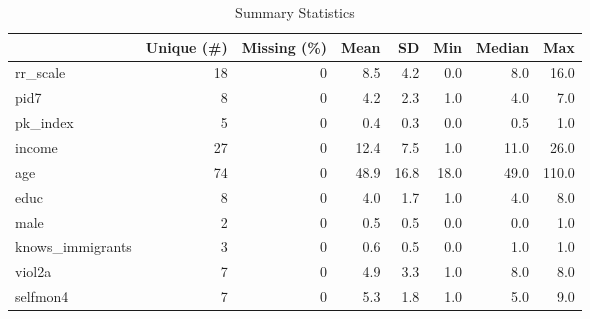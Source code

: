 \begin{table}
\centering
\caption{Summary Statistics}
\centering
\begin{tabular}[t]{lrrrrrrr}
\toprule
  & Unique (\#) & Missing (\%) & Mean & SD & Min & Median & Max\\
\midrule
rr\_scale & 18 & 0 & \num{8.5} & \num{4.2} & \num{0.0} & \num{8.0} & \num{16.0}\\
pid7 & 8 & 0 & \num{4.2} & \num{2.3} & \num{1.0} & \num{4.0} & \num{7.0}\\
pk\_index & 5 & 0 & \num{0.4} & \num{0.3} & \num{0.0} & \num{0.5} & \num{1.0}\\
income & 27 & 0 & \num{12.4} & \num{7.5} & \num{1.0} & \num{11.0} & \num{26.0}\\
age & 74 & 0 & \num{48.9} & \num{16.8} & \num{18.0} & \num{49.0} & \num{110.0}\\
educ & 8 & 0 & \num{4.0} & \num{1.7} & \num{1.0} & \num{4.0} & \num{8.0}\\
male & 2 & 0 & \num{0.5} & \num{0.5} & \num{0.0} & \num{0.0} & \num{1.0}\\
knows\_immigrants & 3 & 0 & \num{0.6} & \num{0.5} & \num{0.0} & \num{1.0} & \num{1.0}\\
viol2a & 7 & 0 & \num{4.9} & \num{3.3} & \num{1.0} & \num{8.0} & \num{8.0}\\
selfmon4 & 7 & 0 & \num{5.3} & \num{1.8} & \num{1.0} & \num{5.0} & \num{9.0}\\
\bottomrule
\end{tabular}
\end{table}

